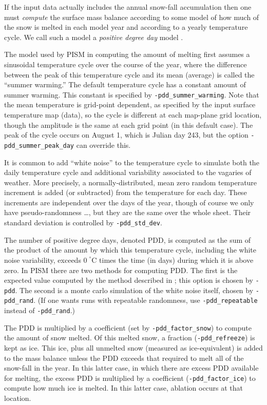 \documentclass[11pt,final]{amsart}
\begin{document}
If the input data actually includes the annual snow-fall accumulation then one must \emph{compute} the surface mass balance according to some model of how much of the snow is melted in each model year and according to a yearly temperature cycle.  We call such a model a \emph{positive degree day} model \cite{CalovGreve05}.

The model used by PISM in computing the amount of melting first assumes a sinusoidal temperature cycle over the course of the year, where the difference between the peak of this temperature cycle and its mean (average) is called the ``summer warming.''  The default temperature cycle has a constant amount of summer warming.  This constant is specified by \verb|-pdd_summer_warming|.  Note that the mean temperature is grid-point dependent, as specified by the input surface temperature map (data), so the cycle is different at each map-plane grid location, though the amplitude is the same at each grid point (in this default case).  The peak of the cycle occurs on August 1, which is Julian day 243, but the option \verb|-pdd_summer_peak_day| can override this.

It is common to add ``white noise'' to the temperature cycle to simulate both the daily temperature cycle and additional variability associated to the vagaries of weather.  More precisely, a normally-distributed, mean zero random temperature increment is added (or subtracted) from the temperature for each day.  These increments are independent over the days of the year, though of course we only have pseudo-randomness \dots, but they are the same over the whole sheet.  Their standard deviation is controlled by \verb|-pdd_std_dev|.

The number of positive degree days, denoted PDD, is computed as the sum of the product of the amount by which this temperature cycle, including the white noise variability, exceeds $0\!\phantom{|}^\circ \text{C}$ times the time (in days) during which it is above zero.  In PISM there are two methods for computing PDD.  The first is the expected value computed by the method described in \cite{CalovGreve05}; this option is chosen by \verb|-pdd|.  The second is a monte carlo simulation of the white noise itself, chosen by \verb|-pdd_rand|.  (If one wants runs with repeatable randomness, use \verb|-pdd_repeatable| instead of \verb|-pdd_rand|.)

The PDD is multiplied by a coefficient (set by \verb|-pdd_factor_snow|) to compute the amount of snow melted.  Of this melted snow, a fraction (\verb|-pdd_refreeze|) is kept as ice.  This ice, plus all unmelted snow (measured as ice-equivalent) is added to the mass balance unless the PDD exceeds that required to melt all of the snow-fall in the year.  In this latter case, in which there are excess PDD available for melting, the excess PDD is multiplied by a coefficient (\verb|-pdd_factor_ice|) to compute how much ice is melted.  In this latter case, ablation occurs at that location.
\end{document}
